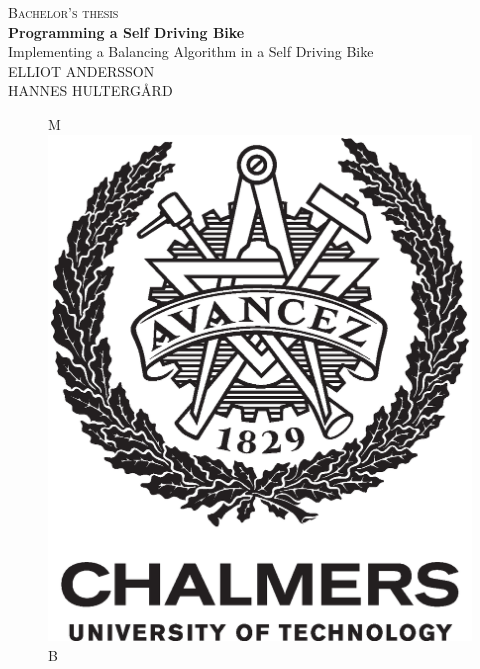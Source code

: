 \newpage
\thispagestyle{empty}
\begin{center}
	\textsc{\large Bachelor's thesis \the\year}\\[4cm]
	\textbf{\Large Programming a Self Driving Bike} \\[1cm]
	{\large Implementing a Balancing Algorithm in a Self Driving Bike}\\[1cm]
	{\large ELLIOT ANDERSSON}\\
	{\large HANNES HULTERGÅRD}
	
	\vfill	
	\begin{figure}[H]
	\centering
	\if\ThesisType M
    \includegraphics[width=0.2\pdfpagewidth]{figure/auxiliary/AvancezChalmersU_black_centered.eps} \\
    \fi
    \if\ThesisType B

\end{figure}
\end{center}
